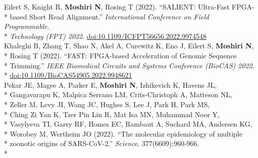 \documentclass[margin,line]{res}
\begin{document}
\begin{resume}
\hspace*{9mm}  Eilert S, Knight R, \textbf{Moshiri N}, Rosing T (2022). ``SALIENT: Ultra-Fast FPGA-\\*
\hspace*{9mm} based Short Read Alignment.'' \textit{International Conference on Field Programmable}.\\*\vspace{2mm}
\hspace*{7mm} \textit{Technology (FPT) 2022}. \href{https://doi.org/10.1109/ICFPT56656.2022.9974548}{doi:10.1109/ICFPT56656.2022.9974548}\\
\hspace*{4mm} Khaleghi B, Zhang T, Shao N, Akel A, Curewitz K, Eno J, Eilert S, \textbf{Moshiri N},\\*
\hspace*{9mm} Rosing T (2022). ``FAST: FPGA-based Acceleration of Genomic Sequence\\*
\hspace*{9mm} Trimming.'' \textit{IEEE Biomedical Circuits and Systems Conference (BioCAS) 2022}.\\*\vspace{2mm}
\hspace*{8mm} \href{https://doi.org/10.1109/BioCAS54905.2022.9948621}{doi:10.1109/BioCAS54905.2022.9948621}\\
\hspace*{4mm} Pekar JE, Magee A, Parker E, \textbf{Moshiri N}, Izhikevich K, Havens JL,\\*
\hspace*{9mm} Gangavarapu K, Malpica Serrano LM, Crits-Christoph A, Matteson NL,\\*
\hspace*{9mm} Zeller M, Levy JI, Wang JC, Hughes S, Lee J, Park H, Park MS,\\*
\hspace*{9mm} Ching Zi Yan K, Tzer Pin Lin R, Mat Isa MN, Muhammad Noor Y,\\*
\hspace*{9mm} Vasylyeva TI, Garry RF, Homes EC, Rambaut A, Suchard MA, Andersen KG,\\*
\hspace*{9mm} Worobey M, Wertheim JO (2022). ``The molecular epidemiology of multiple\\*
\hspace*{9mm} zoonotic origins of SARS-CoV-2.'' \textit{Science}. 377(6609):960-966.\\*\vspace{2mm}

\end{resume}
\end{document}
